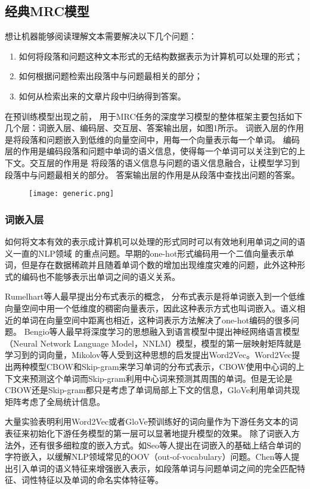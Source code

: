 \subsection{经典MRC模型}
想让机器能够阅读理解文本需要解决以下几个问题：
\begin{enumerate}
	\item 如何将段落和问题这种文本形式的无结构数据表示为计算机可以处理的形式；
	\item 如何根据问题检索出段落中与问题最相关的部分；
	\item 如何从检索出来的文章片段中归纳得到答案。
\end{enumerate}
在预训练模型出现之前，
用于MRC任务的深度学习模型的整体框架主要包括如下几个层：词嵌入层、编码层、交互层、答案输出层，如图1所示。
词嵌入层的作用是将段落和问题嵌入到低维的向量空间中，用每一个向量表示每一个单词。
编码层的作用是编码段落和问题中单词的语义信息，使得每一个单词可以关注到它的上下文。交互层的作用是
将段落的语义信息与问题的语义信息融合，让模型学习到段落中与问题最相关的部分。
答案输出层的作用是从段落中查找出问题的答案。
\begin{figure}
	\centering
	\texttt{[image: generic.png]}
\end{figure}

\subsubsection{词嵌入层}
如何将文本有效的表示成计算机可以处理的形式同时可以有效地利用单词之间的语义一直的NLP领域
的重点问题。早期的one-hot形式编码用一个二值向量表示单词，但是存在数据稀疏并且随着单词个数的增加出现维度灾难的问题，此外这种形式的编码也不能够表示出单词之间的语义关系。

Rumelhart等人最早提出分布式表示的概念，
分布式表示是将单词嵌入到一个低维向量空间中用一个低维度的稠密向量表示，因此这种表示方式也叫词嵌入。语义相近的单词在向量空间中距离也相近，这种词表示方法解决了one-hot编码的很多问题。
Bengio等人最早将深度学习的思想融入到语言模型中提出神经网络语言模型（Neural Network Language Model，NNLM）模型，模型的第一层映射矩阵就是学习到的词向量，Mikolov等人受到这种思想的启发提出Word2Vec。Word2Vec提出两种模型CBOW和Skip-gram来学习单词的分布式表示，CBOW使用中心词的上下文来预测这个单词而Skip-gram利用中心词来预测其周围的单词。但是无论是CBOW还是Skip-gram都只是考虑了单词局部上下文的信息，GloVe利用单词共现矩阵考虑了全局统计信息。


大量实验表明利用Word2Vec或者GloVe预训练好的词向量作为下游任务文本的词表征来初始化下游任务模型的第一层可以显著地提升模型的效果。
除了词嵌入方法外，还有很多细粒度的嵌入方式。如Seo等人提出在词嵌入的基础上结合单词的字符嵌入，以缓解NLP领域常见的OOV（out-of-vocabulary）问题。Chen等人提出引入单词的语义特征来增强嵌入表示，如段落单词与问题单词之间的完全匹配特征、词性特征以及单词的命名实体特征等。

